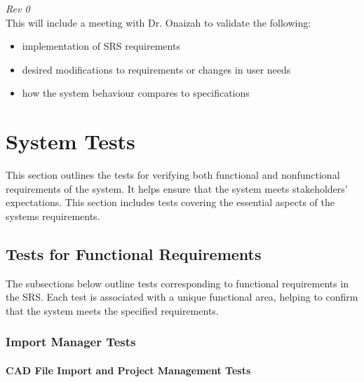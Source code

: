 \documentclass[12pt, titlepage]{article}
\begin{document}
\noindent \textit{Rev 0}\\
\noindent This will include a meeting with Dr. Onaizah to validate the following:
\begin{itemize}
\item implementation of SRS requirements
\item desired modifications to requirements or changes in user needs
\item how the system behaviour compares to specifications
\end{itemize}


\section{System Tests}

\noindent This section outlines the tests for verifying both functional and nonfunctional requirements of the system. It helps ensure that the system meets stakeholders' expectations. This section includes tests covering the essential aspects of the systems requirements.

\subsection{Tests for Functional Requirements}

\noindent The subsections below outline tests corresponding to functional requirements in the SRS.
Each test is associated with a unique functional area, helping to confirm that the system meets
the specified requirements. 

\subsubsection{Import Manager Tests}

\paragraph{CAD File Import and Project Management Tests}
\end{document}
